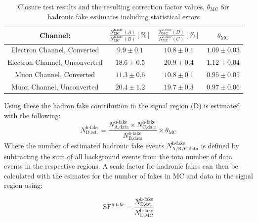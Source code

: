 \begin{table}[h]
\begin{center}
{\renewcommand{\arraystretch}{1.2}
\begin{tabular}{cccc}
\hline
Channel:     &  $\frac{N^\text{h-fake}_\text{MC} (A)}{N^\text{h-fake}_\text{MC} (B)} [\%]$   &   $\frac{N^\text{h-fake}_\text{MC} (D)}{N^\text{h-fake}_\text{MC} (C)} [\%]$ & $\theta_\text{MC}$\\  \hline 
Electron Channel, Converted    & $9.9\pm0.1$   & $10.8\pm 0.1$  & $1.09\pm0.03$	\\ 
Electron Channel, Unconverted & $18.6\pm 0.5$	& $20.9\pm 0.4$   & $1.12 \pm 0.04$\\
Muon Channel, Converted	        &	 $11.3\pm 0.6$	& $10.8\pm 0.1$  & $0.95\pm 0.05$\\
Muon Channel, Unconverted     &  $20.4\pm 1.2$   & $19.7\pm 0.3$   & $0.97 \pm 0.06$       \\ \hline 
\end{tabular}
\caption{Closure test results and the resulting correction factor values, $\theta_\text{MC}$ for hadronic fake estimates including statistical errors }
\label{tab:abcdTheta}
}
\end{center}
\end{table}

 Using these the hadron fake contribution in the signal region (D) is estimated with the following:
\[N_\text{D,est.}^{\text{h-fake}} = \frac{N_\text{A,data}^{\text{h-fake}}\times N_\text{C,data}^{\text{h-fake}}}{N_\text{B,data}^{\text{h-fake}}}\times \theta_\text{MC}
\]
Where the number of estimated hadronic fake events $N_\text{A/B/C,data}^\text{h-fake}$ is defined by subtracting the sum of all background events from the tota number of data events in the respective regions.  A scale factor for hadronic fakes can then be calculated with the esimates for the number of fakes in MC and data in the signal region using:

\[\text{SF}^\text{h-fake} = \frac{N^\text{h-fake}_\text{D,est.}}{N^\text{h-fake}_\text{D,MC}}
\]

